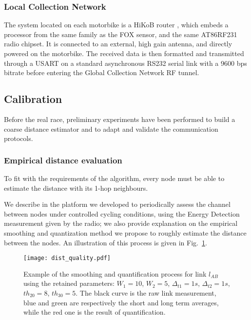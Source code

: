 \documentclass{sig-alternate}
\begin{document}
\subsubsection{Local Collection Network}
The system located on each motorbike is a HiKoB {\lion} router \cite{hikoblion}, which embeds a processor from the same family as the FOX sensor, and the same AT86RF231 radio chipset. It is connected to an external, high gain antenna, and directly powered on the motorbike. The received data is then formatted and transmitted through a USART on a standard asynchronous RS232 serial link with a 9600 bps bitrate before entering the Global Collection Network RF tunnel. 

\subsection{Calibration}
\label{sec:calib}
Before the real race, preliminary experiments have been performed to build a coarse distance estimator and to adapt and validate the communication protocols.

\subsubsection{Empirical distance evaluation}
\label{sec:calib_dist}
To fit with the requirements of the {\gmc} algorithm, every node must be able to estimate the distance with its 1-hop neighbours.


We describe in \cite{mobihoc} the platform we developed to periodically assess the channel between {\fox} nodes under controlled cycling conditions, using the Energy Detection measurement given by the radio; we also provide explanation on the empirical {\ed} smoothing and quantization method we propose to roughly estimate the distance between the nodes.
An illustration of this process is given in Fig.~\ref{fig:smooth_dist}.


\begin{figure}[t!]
\centering
\texttt{[image: dist\_quality.pdf]}
\caption{Example of the smoothing and quantification process for link $l_{AB}$ using the retained parameters:
$W_1=10$, $W_2=5$, $\Delta_{t1}=1s$, $\Delta_{t2}=1s$, $th_{20}=8$, $th_{30}=5$. The black curve is the raw link measurement, blue and green are respectively the short and long term averages, while the red one is the result of quantification.}
\label{fig:smooth_dist}
\end{figure}
\end{document}
